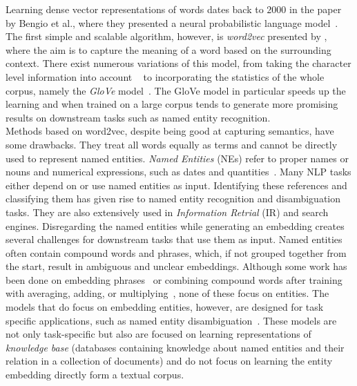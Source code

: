 Learning dense vector representations of words dates back to $2000$ in the paper by Bengio et al., where they presented a neural probabilistic language model~. The first simple and scalable algorithm, however, is \emph{word2vec} presented by , where the aim is to capture the meaning of a word based on the surrounding context. There exist numerous variations of this model, from taking the character level information into account ~ to incorporating the statistics of the whole corpus, namely the \emph{GloVe} model~. The GloVe model in particular speeds up the learning and when trained on a large corpus tends to generate more promising results on downstream tasks such as named entity recognition.\\
Methods based on word2vec, despite being good at capturing semantics, have some drawbacks. They treat all words equally as terms and cannot be directly used to represent named entities. \emph{Named Entities} (NEs) refer to proper names or nouns and numerical expressions, such as dates and quantities~.
Many NLP tasks either depend on or use named entities as input. Identifying these references and classifying them has given rise to named entity recognition and disambiguation tasks. They are also extensively used in \emph{Information Retrial} (IR) and search engines. Disregarding the named entities while generating an embedding creates several challenges for downstream tasks that use them as input. Named entities often contain compound words and phrases, which, if not grouped together from the start, result in ambiguous and unclear embeddings. Although some work has been done on embedding phrases~ or combining compound words after training with averaging, adding, or multiplying~, none of these focus on entities. The models that do focus on embedding entities, however, are designed for task specific applications, such as named entity disambiguation~. These models are not only task-specific but also are focused on learning representations of \emph{knowledge base} (databases containing knowledge about named entities and their relation in a collection of documents) and do not focus on learning the entity embedding directly form a textual corpus.\\
